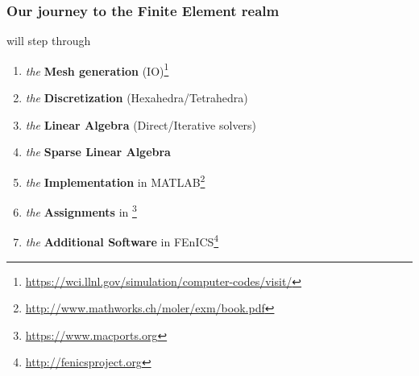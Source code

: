 \documentclass[handout]{beamer}
{
\usepackage{fullpage}
\usepackage{hyperref}
\usepackage{amssymb} 
}
\begin{document}
\begin{frame}
\frametitle{Our journey to the Finite Element realm}

\begin{block}{will step through}
\begin{enumerate}
\item {\it the} {\bf Mesh generation} (IO)\footnote{\url{https://wci.llnl.gov/simulation/computer-codes/visit/}}   
\item {\it the} {\bf Discretization}  (Hexahedra/Tetrahedra)
\item {\it the} {\bf Linear Algebra}  (Direct/Iterative solvers)
\item {\it the} {\bf Sparse Linear Algebra}
\item {\it the} {\bf Implementation} in {\small MATLAB}\footnote{\url{http://www.mathworks.ch/moler/exm/book.pdf}}
\item {\it the} {\bf Assignments} in \footnote{\url{https://www.macports.org} }
\item {\it the} {\bf Additional Software} in \small{FEnICS}\footnote{\url{http://fenicsproject.org}}
\end{enumerate}
\end{block}

\end{frame}
\end{document}
